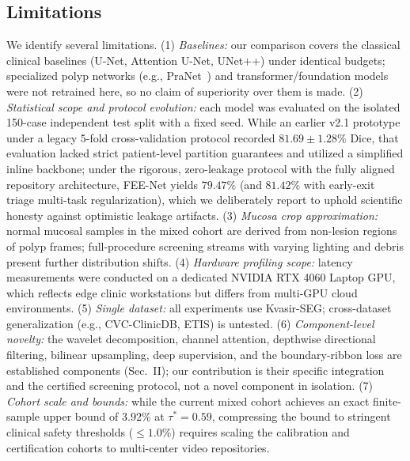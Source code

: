 \documentclass[journal]{IEEEtran}
\begin{document}
\subsection{Limitations}
We identify several limitations. (1) \emph{Baselines:} our comparison covers the classical clinical baselines (U-Net, Attention U-Net, UNet++) under identical budgets; specialized polyp networks (e.g., PraNet~\cite{fan2020pranet}) and transformer/foundation models were not retrained here, so no claim of superiority over them is made. (2) \emph{Statistical scope and protocol evolution:} each model was evaluated on the isolated 150-case independent test split with a fixed seed. While an earlier v2.1 prototype under a legacy 5-fold cross-validation protocol recorded $81.69\pm1.28\%$ Dice, that evaluation lacked strict patient-level partition guarantees and utilized a simplified inline backbone; under the rigorous, zero-leakage protocol with the fully aligned repository architecture, FEE-Net yields $79.47\%$ (and $81.42\%$ with early-exit triage multi-task regularization), which we deliberately report to uphold scientific honesty against optimistic leakage artifacts. (3) \emph{Mucosa crop approximation:} normal mucosal samples in the mixed cohort are derived from non-lesion regions of polyp frames; full-procedure screening streams with varying lighting and debris present further distribution shifts. (4) \emph{Hardware profiling scope:} latency measurements were conducted on a dedicated NVIDIA RTX 4060 Laptop GPU, which reflects edge clinic workstations but differs from multi-GPU cloud environments. (5) \emph{Single dataset:} all experiments use Kvasir-SEG; cross-dataset generalization (e.g., CVC-ClinicDB, ETIS) is untested. (6) \emph{Component-level novelty:} the wavelet decomposition, channel attention, depthwise directional filtering, bilinear upsampling, deep supervision, and the boundary-ribbon loss are established components (Sec.~II); our contribution is their specific integration and the certified screening protocol, not a novel component in isolation. (7) \emph{Cohort scale and bounds:} while the current mixed cohort achieves an exact finite-sample upper bound of $3.92\%$ at $\tau^*=0.59$, compressing the bound to stringent clinical safety thresholds ($\le 1.0\%$) requires scaling the calibration and certification cohorts to multi-center video repositories.
\end{document}

